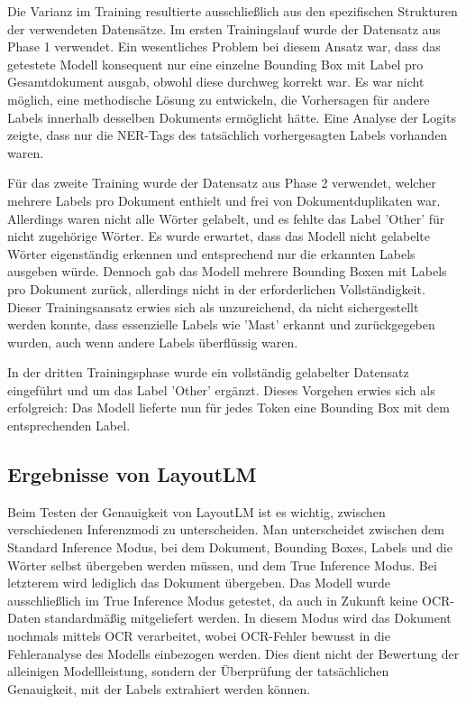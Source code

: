 \documentclass[12pt,a4paper,twoside]{article}
\begin{document}
Die Varianz im Training resultierte ausschließlich aus den spezifischen Strukturen der verwendeten Datensätze. Im ersten Trainingslauf wurde der Datensatz aus Phase 1 verwendet. Ein wesentliches  Problem bei diesem Ansatz war, dass das getestete Modell konsequent nur eine einzelne Bounding Box mit Label pro Gesamtdokument ausgab, obwohl diese durchweg korrekt war. Es war nicht möglich, eine methodische Lösung zu entwickeln, die Vorhersagen für andere Labels innerhalb desselben Dokuments ermöglicht hätte. Eine Analyse der Logits zeigte, dass nur die NER-Tags des tatsächlich vorhergesagten Labels vorhanden waren.

Für das zweite Training wurde der Datensatz aus Phase 2 verwendet, welcher mehrere Labels pro Dokument enthielt und frei von Dokumentduplikaten war. Allerdings waren nicht alle Wörter gelabelt, und es fehlte das Label 'Other' für nicht zugehörige Wörter. Es wurde erwartet, dass das Modell nicht gelabelte Wörter eigenständig erkennen und entsprechend nur die erkannten Labels ausgeben würde. Dennoch gab das Modell mehrere Bounding Boxen mit Labels pro Dokument zurück, allerdings nicht in der erforderlichen Vollständigkeit. Dieser Trainingsansatz erwies sich als unzureichend, da nicht sichergestellt werden konnte, dass essenzielle Labels wie 'Mast' erkannt und zurückgegeben wurden, auch wenn andere Labels überflüssig waren.

In der dritten Trainingsphase wurde ein vollständig gelabelter Datensatz eingeführt und um das Label 'Other' ergänzt. Dieses Vorgehen erwies sich als erfolgreich: Das Modell lieferte nun für jedes Token eine Bounding Box mit dem entsprechenden Label.

\subsection{Ergebnisse von LayoutLM}

Beim Testen der Genauigkeit von LayoutLM ist es wichtig, zwischen verschiedenen Inferenzmodi zu unterscheiden. Man unterscheidet zwischen dem Standard Inference Modus, bei dem Dokument, Bounding Boxes, Labels und die Wörter selbst übergeben werden müssen, und dem True Inference Modus. Bei letzterem wird lediglich das Dokument übergeben. Das Modell wurde ausschließlich im True Inference Modus getestet, da auch in Zukunft keine OCR-Daten standardmäßig mitgeliefert werden. In diesem Modus wird das Dokument nochmals mittels OCR verarbeitet, wobei OCR-Fehler bewusst in die Fehleranalyse des Modells einbezogen werden. Dies dient nicht der Bewertung der alleinigen Modellleistung, sondern der Überprüfung der tatsächlichen Genauigkeit, mit der Labels extrahiert werden können.
\end{document}
